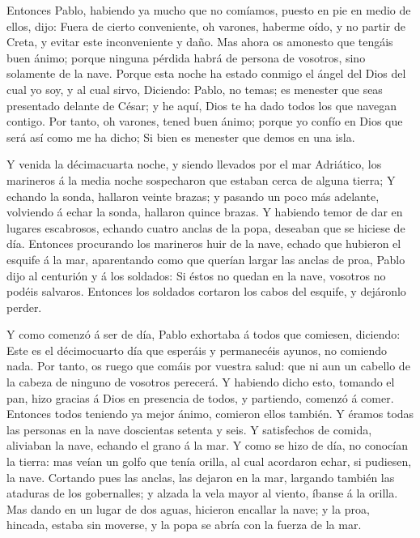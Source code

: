  Entonces Pablo, habiendo ya mucho que no comíamos, puesto
en pie en medio de ellos, dijo: Fuera de cierto conveniente, oh varones,
haberme oído, y no partir de Creta, y evitar este inconveniente y daño.
 Mas ahora os amonesto que tengáis buen ánimo; porque
ninguna pérdida habrá de persona de vosotros, sino solamente de la nave.
 Porque esta noche ha estado conmigo el ángel del Dios del
cual yo soy, y al cual sirvo,  Diciendo: Pablo, no temas;
es menester que seas presentado delante de César; y he aquí, Dios te ha
dado todos los que navegan contigo.  Por tanto, oh varones,
tened buen ánimo; porque yo confío en Dios que será así como me ha
dicho;  Si bien es menester que demos en una isla.

 Y venida la décimacuarta noche, y siendo llevados por el
mar Adriático, los marineros á la media noche sospecharon que estaban
cerca de alguna tierra;  Y echando la sonda, hallaron
veinte brazas; y pasando un poco más adelante, volviendo á echar la
sonda, hallaron quince brazas.  Y habiendo temor de dar en
lugares escabrosos, echando cuatro anclas de la popa, deseaban que se
hiciese de día.  Entonces procurando los marineros huir de
la nave, echado que hubieron el esquife á la mar, aparentando como que
querían largar las anclas de proa,  Pablo dijo al centurión
y á los soldados: Si éstos no quedan en la nave, vosotros no podéis
salvaros.  Entonces los soldados cortaron los cabos del
esquife, y dejáronlo perder.

 Y como comenzó á ser de día, Pablo exhortaba á todos que
comiesen, diciendo: Este es el décimocuarto día que esperáis y
permanecéis ayunos, no comiendo nada.  Por tanto, os ruego
que comáis por vuestra salud: que ni aun un cabello de la cabeza de
ninguno de vosotros perecerá.  Y habiendo dicho esto,
tomando el pan, hizo gracias á Dios en presencia de todos, y partiendo,
comenzó á comer.  Entonces todos teniendo ya mejor ánimo,
comieron ellos también.  Y éramos todas las personas en la
nave doscientas setenta y seis.  Y satisfechos de comida,
aliviaban la nave, echando el grano á la mar.  Y como se
hizo de día, no conocían la tierra: mas veían un golfo que tenía orilla,
al cual acordaron echar, si pudiesen, la nave.  Cortando
pues las anclas, las dejaron en la mar, largando también las ataduras de
los gobernalles; y alzada la vela mayor al viento, íbanse á la orilla.
 Mas dando en un lugar de dos aguas, hicieron encallar la
nave; y la proa, hincada, estaba sin moverse, y la popa se abría con la
fuerza de la mar.

